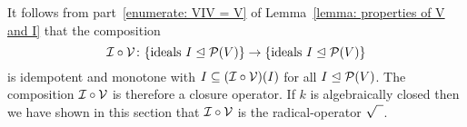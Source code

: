 \begin{remark}
  It follows from part~\ref*{enumerate: VIV = V} of Lemma~\ref{lemma: properties of V and I} that the composition
  \[
            \mathcal{I} \circ \mathcal{V}
    \colon  \{ \text{ideals $I \trianglelefteq \mathcal{P}(V)$} \}
    \to     \{ \text{ideals $I \trianglelefteq \mathcal{P}(V)$} \}
  \]
  is idempotent and monotone with $I \subseteq (\mathcal{I} \circ \mathcal{V})(I)$ for all $I \trianglelefteq \mathcal{P}(V)$.
  The composition $\mathcal{I} \circ \mathcal{V}$ is therefore a closure operator.
  If $k$ is algebraically closed then we have shown in this section that $\mathcal{I} \circ \mathcal{V}$ is the radical-operator $\sqrt{\phantom{I}}$.
\end{remark}


%   
%   
